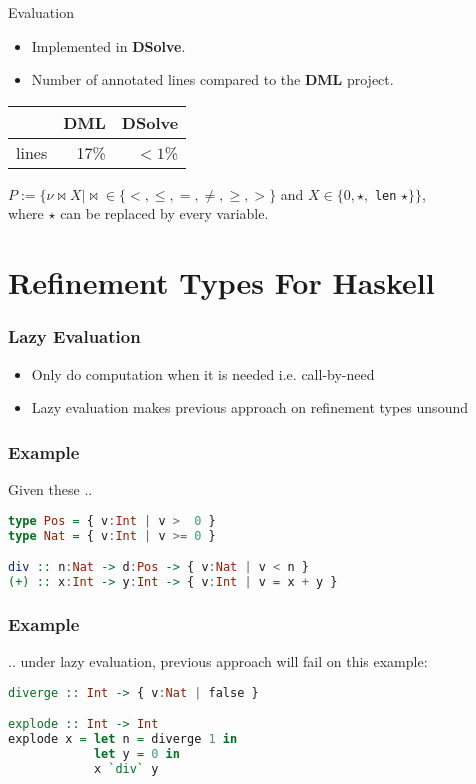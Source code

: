 \documentclass[pdf]{beamer}
\begin{document}
\begin{frame}{Evaluation}
  \begin{itemize}
    \item Implemented in \textbf{DSolve}.
    \item Number of annotated lines compared to the \textbf{DML} project.
  \end{itemize}
  \begin{table}
    \begin{tabular}{l|r|r}
            & \textbf{DML} & \textbf{DSolve}\\
      \hline
      lines & 17\%         & $< 1$\%
    \end{tabular}
  \end{table}
  $P := \{\nu \bowtie X \mid \bowtie \in \{<, \le, =, \neq, \geq, >\}$ and $X \in \{0, \star,$ \lstinline{len} $\star\}\}$,\\
  where $\star$ can be replaced by every variable.
\end{frame}

\section{Refinement Types For Haskell}

\begin{frame}
  \frametitle{Lazy Evaluation}
  \begin{itemize}
    \item Only do computation when it is needed i.e. call-by-need
    \item Lazy evaluation makes previous approach on refinement types unsound
  \end{itemize}
\end{frame}

\begin{frame}[fragile]
  \frametitle{Example}
  Given these ..
  \begin{lstlisting}[language=haskell]
type Pos = { v:Int | v >  0 }
type Nat = { v:Int | v >= 0 }

div :: n:Nat -> d:Pos -> { v:Nat | v < n } 
(+) :: x:Int -> y:Int -> { v:Int | v = x + y }
  \end{lstlisting}
\end{frame}

\begin{frame}[fragile]
  \frametitle{Example}
  .. under lazy evaluation, previous approach will fail on this example:
  \begin{lstlisting}[language=haskell]
diverge :: Int -> { v:Nat | false } 

explode :: Int -> Int
explode x = let n = diverge 1 in 
            let y = 0 in 
            x `div` y
  \end{lstlisting}
\end{frame}
\end{document}

